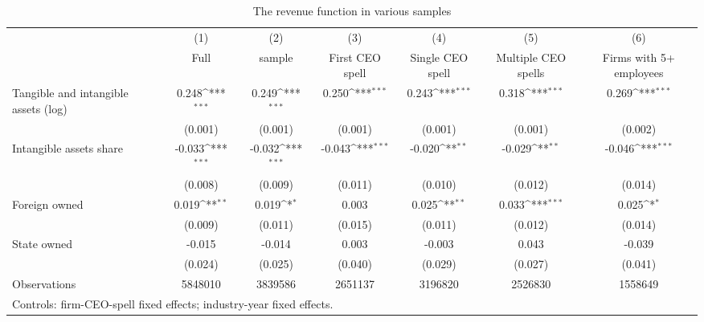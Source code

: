 \begin{table}[htbp]\centering
\def\sym#1{\ifmmode^{#1}\else\(^{#1}\)\fi}
\caption{The revenue function in various samples}
\begin{tabular}{l*{6}{c}}
\hline\hline
                    &\multicolumn{1}{c}{(1)}&\multicolumn{1}{c}{(2)}&\multicolumn{1}{c}{(3)}&\multicolumn{1}{c}{(4)}&\multicolumn{1}{c}{(5)}&\multicolumn{1}{c}{(6)}\\
                    &\multicolumn{1}{c}{Full}&\multicolumn{1}{c}{sample}&\multicolumn{1}{c}{First CEO spell}&\multicolumn{1}{c}{Single CEO spell}&\multicolumn{1}{c}{Multiple CEO spells}&\multicolumn{1}{c}{Firms with 5+ employees}\\
\hline
Tangible and intangible assets (log)&       0.248\sym{***}&       0.249\sym{***}&       0.250\sym{***}&       0.243\sym{***}&       0.318\sym{***}&       0.269\sym{***}\\
                    &     (0.001)         &     (0.001)         &     (0.001)         &     (0.001)         &     (0.001)         &     (0.002)         \\
[1em]
Intangible assets share&      -0.033\sym{***}&      -0.032\sym{***}&      -0.043\sym{***}&      -0.020\sym{**} &      -0.029\sym{**} &      -0.046\sym{***}\\
                    &     (0.008)         &     (0.009)         &     (0.011)         &     (0.010)         &     (0.012)         &     (0.014)         \\
[1em]
Foreign owned       &       0.019\sym{**} &       0.019\sym{*}  &       0.003         &       0.025\sym{**} &       0.033\sym{***}&       0.025\sym{*}  \\
                    &     (0.009)         &     (0.011)         &     (0.015)         &     (0.011)         &     (0.012)         &     (0.014)         \\
[1em]
State owned         &      -0.015         &      -0.014         &       0.003         &      -0.003         &       0.043         &      -0.039         \\
                    &     (0.024)         &     (0.025)         &     (0.040)         &     (0.029)         &     (0.027)         &     (0.041)         \\
\hline
Observations        &     5848010         &     3839586         &     2651137         &     3196820         &     2526830         &     1558649         \\
\hline\hline
\multicolumn{7}{l}{\footnotesize Controls: firm-CEO-spell fixed effects; industry-year fixed effects.}\\
\end{tabular}
\end{table}
